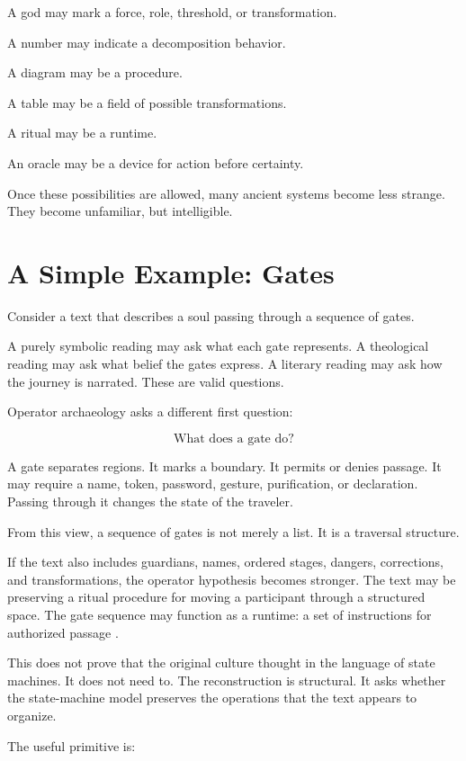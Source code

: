 \documentclass[11pt]{book}
\begin{document}
A god may mark a force, role, threshold, or transformation.

A number may indicate a decomposition behavior.

A diagram may be a procedure.

A table may be a field of possible transformations.

A ritual may be a runtime.

An oracle may be a device for action before certainty.

Once these possibilities are allowed, many ancient systems become less strange. They become unfamiliar, but intelligible.

\section{A Simple Example: Gates}

Consider a text that describes a soul passing through a sequence of gates.

A purely symbolic reading may ask what each gate represents. A theological reading may ask what belief the gates express. A literary reading may ask how the journey is narrated. These are valid questions.

Operator archaeology asks a different first question:

\[
\text{What does a gate do?}
\]

A gate separates regions. It marks a boundary. It permits or denies passage. It may require a name, token, password, gesture, purification, or declaration. Passing through it changes the state of the traveler.

From this view, a sequence of gates is not merely a list. It is a traversal structure.

If the text also includes guardians, names, ordered stages, dangers, corrections, and transformations, the operator hypothesis becomes stronger. The text may be preserving a ritual procedure for moving a participant through a structured space. The gate sequence may function as a runtime: a set of instructions for authorized passage \cite{Allen1974BookDead,Faulkner1972BookDead,Hornung1999BooksAfterlife,Hornung1990BookGates}.

This does not prove that the original culture thought in the language of state machines. It does not need to. The reconstruction is structural. It asks whether the state-machine model preserves the operations that the text appears to organize.

The useful primitive is:
\end{document}

